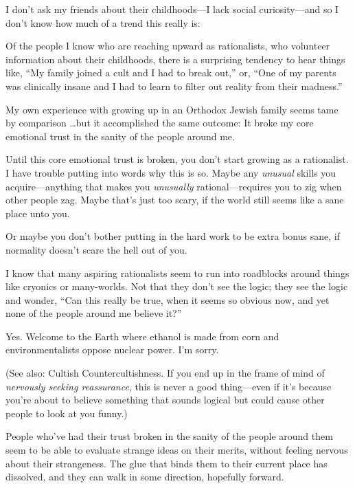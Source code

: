 \myendsectiontext


{
 I don't ask my friends about their childhoods---I
lack social curiosity---and so I don't know how much of
a trend this really is: }

{
 Of the people I know who are reaching upward as rationalists, who
volunteer information about their childhoods, there is a surprising
tendency to hear things like, ``My family joined a
cult and I had to break out,'' or,
``One of my parents was clinically insane and I had to
learn to filter out reality from their madness.''}

{
 My own experience with growing up in an Orthodox Jewish family
seems tame by comparison \ldots but it accomplished the same outcome: It
broke my core emotional trust in the sanity of the people around me.}

{
 Until this core emotional trust is broken, you
don't start growing as a rationalist. I have trouble
putting into words why this is so. Maybe any \textit{unusual} skills
you acquire---anything that makes you \textit{unusually}
rational---requires you to zig when other people zag. Maybe
that's just too scary, if the world still seems like a
sane place unto you.}

{
 Or maybe you don't bother putting in the hard work
to be extra bonus sane, if normality doesn't scare the
hell out of you.}

{
 I know that many aspiring rationalists seem to run into roadblocks
around things like cryonics or many-worlds. Not that they
don't see the logic; they see the logic and wonder,
``Can this really be true, when it seems so obvious
now, and yet none of the people around me believe
it?''}

{
 Yes. Welcome to the Earth where ethanol is made from corn and
environmentalists oppose nuclear power. I'm sorry.}

{
 (See also: Cultish Countercultishness. If you end up in the frame
of mind of \textit{nervously seeking reassurance}, this is never a good
thing---even if it's because you're
about to believe something that sounds logical but could cause other
people to look at you funny.)}

{
 People who've had their trust broken in the sanity
of the people around them seem to be able to evaluate strange ideas on
their merits, without feeling nervous about their strangeness. The glue
that binds them to their current place has dissolved, and they can walk
in some direction, hopefully forward.}

